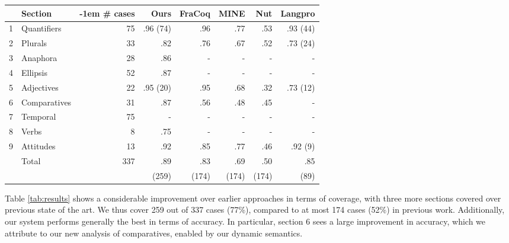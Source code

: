 \documentclass[11pt]{article}
\begin{document}
\providecommand\forcecenter{\multicolumn{1}{c}}
\begin{table*}
  \centering
\begin{tabular}{rlrrrrrr}
  & Section      & {\kern -1em} \# cases & Ours     & FraCoq & MINE & Nut  & Langpro  \\ \hline
1 & Quantifiers  & 75          & .96 (74) & .96    & .77  & .53  & .93 (44) \\
2 & Plurals      & 33          & .82      & .76    & .67  & .52  & .73 (24) \\
3 & Anaphora     & 28          & .86      &   -    & -    & -    &  -       \\
4 & Ellipsis     & 52          & .87      &   -    & -    & -    &  -       \\
5 & Adjectives   & 22          & .95 (20) & .95    & .68  & .32  & .73 (12) \\
6 & Comparatives & 31          & .87      & .56    & .48  & .45  &  -       \\
7 & Temporal     & 75          &  -       &   -    &   -  &  -   &  -       \\
8 & Verbs        & 8           & .75      &   -    & -    & -    &  -       \\
9 & Attitudes    & 13          & .92      & .85    & .77  & .46  & .92 (9)  \\ \hline
  & Total        & 337         & .89      & .83    & .69  & .50  & .85  \\
  &              &             & (259)    & (174)  & (174)& (174)& (89)
  \end{tabular}
  \caption{Overview of the accuracy of our system compared to others.
    ``Ours" refers to the approach presented in this paper. When a
    system does not handle the nominal number of test cases shown in the
    third column, the actual number of test cases attempted is shown in
    parentheses.  ``FraCoq'' refers to the work of
    \citet{bernardy_type_2017}. ``MINE" refers to the approach of
    \citet{Mineshima:2015}, ``NUT" to the CCG system that utilizes the
    first-order automated theorem prover \textit{nutcracker} described
    by \citet{bos:2008}, and ``Langpro" to the system presented by
    \citet{Abzianidze:2015}. A dash indicates that no attempt was made
    for a given section. }
  \label{tab:results}
\end{table*}

Table \ref{tab:results} shows a considerable improvement over earlier
approaches in terms of coverage, with three more sections covered over
previous state of the art. We thus cover 259 out of 337 cases (77\%),
compared to at most 174 cases (52\%) in previous work. Additionally,
our system performs generally the best in terms of accuracy. In
particular, section 6 sees a large improvement in accuracy, which we
attribute to our new analysis of comparatives, enabled by our dynamic
semantics.
\end{document}
